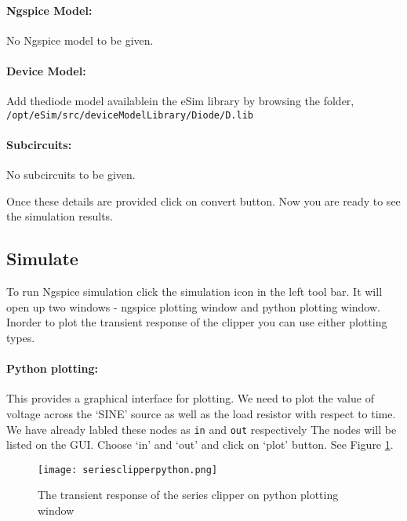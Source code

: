 \paragraph{Ngspice Model:} No Ngspice model to be given.

\paragraph{Device Model:} Add thediode model availablein the eSim library by browsing the folder, \texttt{/opt/eSim/src/deviceModelLibrary/Diode/D.lib}

\paragraph{Subcircuits:} No subcircuits to be given.

\noindent Once these details are provided click on convert button.  Now you are ready to see the simulation results.


\paragraph{}
\subsection*{Simulate} To run Ngspice simulation click the simulation icon in the left tool bar. It will open up two windows - ngspice plotting window and python plotting window. Inorder to plot the transient response of the clipper you can use either plotting types.

\paragraph{Python plotting:}This provides a graphical interface for plotting. We need to plot the value of voltage across the `SINE' source as well as the load resistor with respect to time. We have already labled these nodes as \texttt{in} and \texttt{out} respectively The nodes will be listed on the GUI. Choose  `in' and `out' and click on `plot' button. See Figure \ref{seriesclipperpython}.

\begin{figure}[h]
\centering
\texttt{[image: seriesclipperpython.png]}
\caption{The transient response of the series clipper on python plotting window}
\label{seriesclipperpython}
\end{figure}

